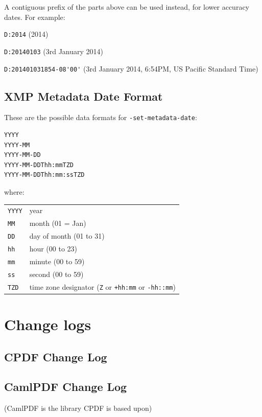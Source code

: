 \documentclass{book}
\begin{document}
\noindent A contiguous prefix of the parts above can be used instead, for lower
accuracy dates. For example:

\begin{framed}
   \small\noindent\verb!D:2014! (2014)
   
   \vspace{1.5mm}
   \noindent\verb!D:20140103! (3rd January 2014)

   \vspace{1.5mm}
   \noindent\verb!D:201401031854-08'00'! (3rd January 2014, 6:54PM, US Pacific Standard Time)
   
\end{framed}

\section{XMP Metadata Date Format}
\label{xmpdate}


These are the possible data formats for \texttt{-set-metadata-date}:

\begin{verbatim}
YYYY
YYYY-MM
YYYY-MM-DD
YYYY-MM-DDThh:mmTZD
YYYY-MM-DDThh:mm:ssTZD
\end{verbatim}

\noindent where:

\medskip
\begin{tabular}{ll}
\texttt{YYYY} & year \\
\texttt{MM} & month (01 = Jan)\\
\texttt{DD} & day of month (01 to 31)\\
\texttt{hh} & hour (00 to 23)\\
\texttt{mm} & minute (00 to 59)\\
\texttt{ss} & second (00 to 59)\\
\texttt{TZD} & time zone designator (\texttt{Z} or \texttt{+hh:mm} or \texttt{-hh::mm})
\end{tabular}
\pagestyle{fancy}

\vfill
\ifdefined\HCode
\else
\chapter{Change logs}\pagestyle{empty}

\section{CPDF Change Log}
{\footnotesize\begin{alltt}

\end{alltt}}

\section{CamlPDF Change Log}
(CamlPDF is the library CPDF is based upon)

{\footnotesize\begin{alltt}

\end{alltt}}
\fi

\end{document}

